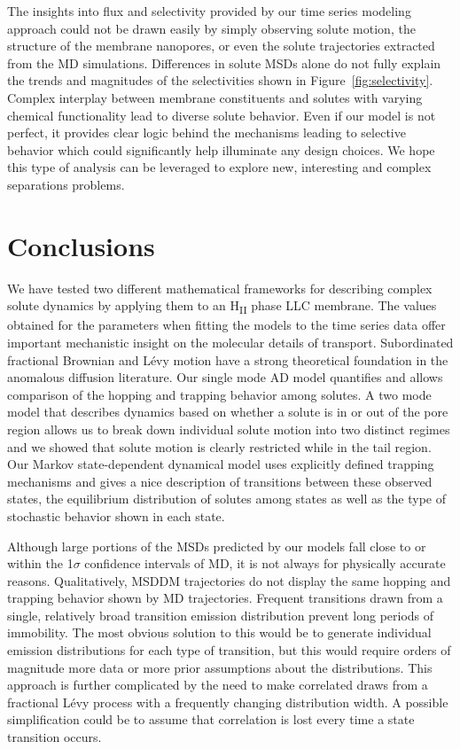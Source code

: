 \documentclass[journal=jctcce,manuscript=article]{achemso}
\begin{document}
  The insights into flux and selectivity provided by our time series modeling
  approach could not be drawn easily by simply observing solute motion, the
  structure of the membrane nanopores, or even the solute trajectories
  extracted from the MD simulations. Differences in solute MSDs alone do not
  fully explain the trends and magnitudes of the selectivities shown in
  Figure~\ref{fig:selectivity}. Complex interplay between membrane
  constituents and solutes with varying chemical functionality lead to diverse
  solute behavior. Even if our model is not perfect, it provides clear logic
  behind the mechanisms leading to selective behavior which could significantly
  help illuminate any design choices. We hope this type of analysis can be 
  leveraged to explore new, interesting and complex separations problems.
  
  \section{Conclusions}
  
  We have tested two different mathematical frameworks for
  describing complex solute dynamics
  by applying them to an H\textsubscript{II} phase LLC membrane. The
  values obtained for the parameters when fitting the models to the time series
  data offer important mechanistic insight on the molecular details of
  transport. Subordinated fractional Brownian and L\'evy motion have a strong
  theoretical foundation in the anomalous diffusion literature. Our single mode
  AD model quantifies and allows comparison of the hopping and trapping behavior
  among solutes. A two mode model that describes dynamics based on whether a
  solute is in or out of the pore region allows us to break down individual
  solute motion into two distinct regimes and we showed that solute motion
  is clearly restricted while in the tail region. Our Markov state-dependent
  dynamical model uses explicitly defined trapping mechanisms and gives a nice
  description of transitions between these observed states, the equilibrium
  distribution of solutes among states as well as the type of stochastic
  behavior shown in each state. 
  
  Although large portions of the MSDs predicted by our models fall close to or
  within the 1$\sigma$ confidence intervals of MD, it is not always for
  physically accurate reasons. Qualitatively, MSDDM trajectories do not display
  the same hopping and trapping behavior shown by MD trajectories. Frequent
  transitions drawn from a single, relatively broad transition emission
  distribution prevent long periods of immobility. The most obvious solution to
  this would be to generate individual emission distributions for each type of
  transition, but this would require orders of magnitude more data or more
  prior assumptions about the distributions. This approach is further
  complicated by the need to make correlated draws from a fractional L\'evy
  process with a frequently changing distribution width. A possible
  simplification could be to assume that correlation is lost every time a state
  transition occurs.
\end{document}
